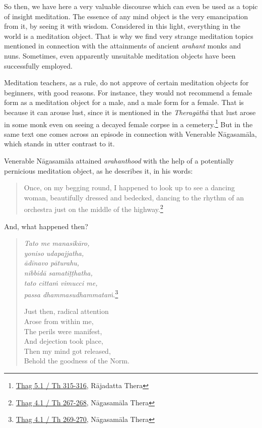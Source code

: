 So then, we have here a very valuable discourse which can even be used as a topic of insight meditation. The essence of any mind object is the very emancipation from it, by seeing it with wisdom. Considered in this light, everything in the world is a meditation object. That is why we find very strange meditation topics mentioned in connection with the attainments of ancient \emph{arahant} monks and nuns. Sometimes, even apparently unsuitable meditation objects have been successfully employed.

Meditation teachers, as a rule, do not approve of certain meditation objects for beginners, with good reasons. For instance, they would not recommend a female form as a meditation object for a male, and a male form for a female. That is because it can arouse lust, since it is mentioned in the \emph{Theragāthā} that lust arose in some monk even on seeing a decayed female corpse in a cemetery.\footnote{\href{https://suttacentral.net/thag5.1/pli/ms}{Thag 5.1 / Th 315-316}, Rājadatta Thera} But in the same text one comes across an episode in connection with Venerable Nāgasamāla, which stands in utter contrast to it.

Venerable Nāgasamāla attained \emph{arahanthood} with the help of a potentially pernicious meditation object, as he describes it, in his words:

\begin{quote}
Once, on my begging round, I happened to look up to see a dancing woman, beautifully dressed and bedecked, dancing to the rhythm of an orchestra just on the middle of the highway.\footnote{\href{https://suttacentral.net/thag4.1/pli/ms}{Thag 4.1 / Th 267-268}, Nāgasamāla Thera}
\end{quote}

And, what happened then?

\begin{quote}
\emph{Tato me manasikāro,}\\
\emph{yoniso udapajjatha,}\\
\emph{ādīnavo pāturahu,}\\
\emph{nibbidā samatiṭṭhatha,}\\
\emph{tato cittaṁ vimucci me,}\\
\emph{passa dhammasudhammataṁ}.\footnote{\href{https://suttacentral.net/thag4.1/pli/ms}{Thag 4.1 / Th 269-270}, Nāgasamāla Thera}

Just then, radical attention\\
Arose from within me,\\
The perils were manifest,\\
And dejection took place,\\
Then my mind got released,\\
Behold the goodness of the Norm.
\end{quote}

